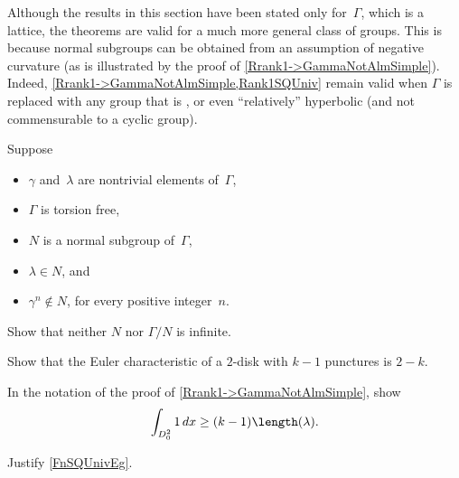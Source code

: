 \begin{rem}
Although the results in this section have been stated only for~$\Gamma$, which is a lattice, the theorems are valid for a much more general class of groups. 
This is because normal subgroups can be obtained from an assumption of negative curvature (as is illustrated by the proof of \cref{Rrank1->GammaNotAlmSimple}). Indeed, \cref{Rrank1->GammaNotAlmSimple,Rank1SQUniv} remain valid when $\Gamma$ is replaced with 
any group that is  , or even ``relatively'' hyperbolic (and not commensurable to a cyclic group).
\end{rem}


\begin{exercises}

\item \label{EnoughGammaNontrivEx}
Suppose 
	\begin{itemize}
	\item $\gamma$ and~$\lambda$ are nontrivial elements of~$\Gamma$,
	\item $\Gamma$ is torsion free,
	\item $N$ is a normal subgroup of~$\Gamma$,
	\item $\lambda \in N$,
	and
	\item $\gamma^n \notin N$, for every positive integer~$n$.
	\end{itemize}
Show that neither $N$ nor $\Gamma/N$ is infinite.

\item \label{Chi(PuncturedDiskEx)}
Show that the {Euler characteristic} of a $2$-disk with $k-1$ punctures is $2 - k$.

\item \label{IntBdryCollarsEx}
In the notation of the proof of \cref{Rrank1->GammaNotAlmSimple}, show
	$$  \int_{D^2_0} 1 \, dx \ge  (k-1) \length(\lambda) .$$

\item \label{FnSQUnivEx}
Justify \cref{FnSQUnivEg}.


\end{exercises}






